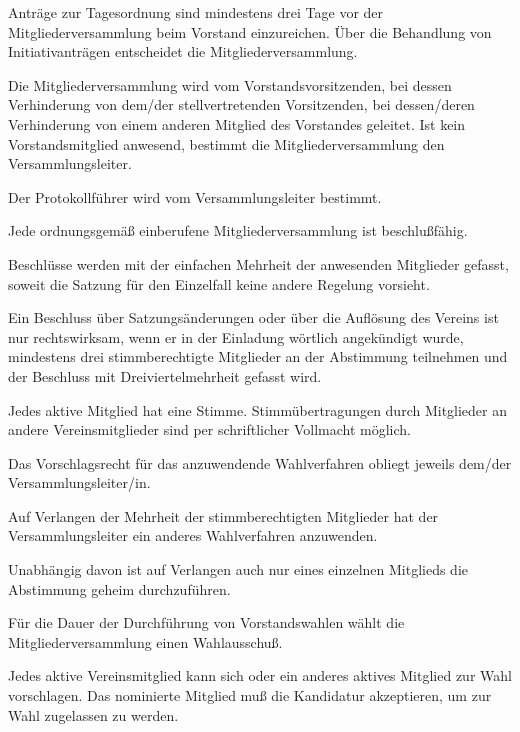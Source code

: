 \documentclass[draft]{scrartcl}
\begin{document}
\begin{contract}
Anträge zur Tagesordnung sind mindestens drei Tage vor der
Mitgliederversammlung beim Vorstand einzureichen. Über die Behandlung von
Initiativanträgen entscheidet die Mitgliederversammlung.


Die Mitgliederversammlung wird vom Vorstandsvorsitzenden, bei dessen
Verhinderung von dem/der stellvertretenden Vorsitzenden, bei dessen/deren Verhinderung
von einem anderen Mitglied des Vorstandes geleitet. Ist kein Vorstandsmitglied
anwesend, bestimmt die Mitgliederversammlung den Versammlungsleiter.

Der Protokollführer wird vom Versammlungsleiter bestimmt.


Jede ordnungsgemäß einberufene Mitgliederversammlung ist beschlußfähig.

Beschlüsse werden mit der einfachen Mehrheit der anwesenden Mitglieder gefasst,
soweit die Satzung für den Einzelfall keine andere Regelung vorsieht.

Ein Beschluss über Satzungsänderungen oder über die Auflösung des Vereins ist
nur rechtswirksam, wenn er in der Einladung wörtlich angekündigt wurde,
mindestens drei stimmberechtigte Mitglieder an der Abstimmung teilnehmen und
der Beschluss mit Dreiviertelmehrheit gefasst wird.\label{MV-Aufloesung}


Jedes aktive Mitglied hat eine Stimme. Stimmübertragungen durch
Mitglieder an andere Vereinsmitglieder sind per schriftlicher Vollmacht
möglich.\label{Stimmrechte}

Das Vorschlagsrecht für das anzuwendende Wahlverfahren obliegt jeweils
dem/der Versammlungsleiter/in. 

Auf Verlangen der Mehrheit der stimmberechtigten Mitglieder hat der 
Versammlungsleiter ein anderes Wahlverfahren anzuwenden.

Unabhängig davon ist auf Verlangen auch nur eines einzelnen Mitglieds
die Abstimmung geheim durchzuführen.

Für die Dauer der Durchführung von Vorstandswahlen wählt die
Mitgliederversammlung einen Wahlausschuß.

Jedes aktive Vereinsmitglied kann sich oder ein anderes aktives Mitglied zur
Wahl vorschlagen. Das nominierte Mitglied muß die Kandidatur akzeptieren, um
zur Wahl zugelassen zu werden.


\end{contract}
\end{document}
